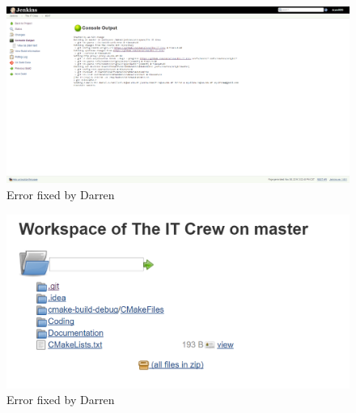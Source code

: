 \documentclass[UTF8]{article}
\begin{document}
\newpage
\begin{figure}[h]
  \includegraphics[width=\textwidth, height=\textheight,keepaspectratio]{BreakFix3Darren.PNG}
  \caption{Error fixed by Darren}
\end{figure}

\begin{figure}[h]
  \includegraphics[width=\textwidth, height=\textheight,keepaspectratio]{Workspace}
  \caption{Error fixed by Darren}
\end{figure}

\newpage
\end{document}

